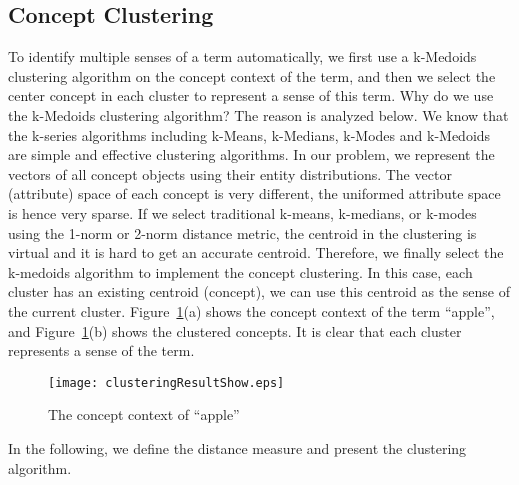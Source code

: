 \subsection{Concept Clustering}
To identify multiple senses of a term automatically, we first use a k-Medoids clustering algorithm on the concept context of the term, and then
we select the center concept in each cluster to represent a sense of this term. Why do we use the k-Medoids clustering algorithm? The reason is analyzed below. We know that the k-series algorithms including k-Means, k-Medians, k-Modes and k-Medoids are simple and effective clustering algorithms. In our problem, we represent the vectors of all concept objects using their entity distributions. The vector (attribute) space of each concept is very different, the uniformed attribute space is hence very sparse. If we select traditional k-means, k-medians, or k-modes using the 1-norm or 2-norm distance metric, the centroid in the clustering is virtual and it is hard to get an accurate centroid. Therefore, we finally select the k-medoids algorithm to implement the concept clustering. In this case, each cluster has an existing centroid (concept), we can use this centroid as the sense of the current cluster.
Figure~\ref{fig:clustersOfApp}(a) shows the concept context of
the term ``apple'', and Figure~\ref{fig:clustersOfApp}(b) shows the clustered concepts. It is clear that each cluster represents a sense of the
term.

\begin{figure}[!h]
 \centering
 \texttt{[image: clusteringResultShow.eps]}
 \caption{The concept context of ``apple''}
 \label{fig:clustersOfApp}
\end{figure}

In the following, we define the distance measure and present the
clustering algorithm.



